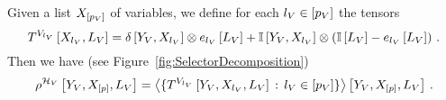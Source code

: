 \begin{theorem}\label{the:varSelectorDecomposition}
	Given a list $X_{[p_{V}]}$ of variables, we define for each $l_{V}\in[p_{V}]$ the tensors
		\[ T^{V_{l_{V}}}\left[X_{l_{V}},L_{V}\right] 
		= \delta\left[Y_{V},X_{l_{V}}\right] \otimes e_{l_{V}}\left[L_{V}\right] 
		+ \mathbb{I}\left[Y_{V},X_{l_{V}}\right] \otimes \left(\mathbb{I}\left[L_{V}\right] - e_{l_{V}}\left[L_{V}\right] \right) \, . 
		\]
	Then we have (see Figure~\ref{fig:SelectorDecomposition})
		\[ \rho^{\mathcal{H}_{V}}\left[Y_{V},X_{[p]},L_{V}\right]
		= \left\langle 
			\{T^{V_{l_{V}}}\left[Y_{V},X_{l_{V}},L_{V}\right] \, : \, l_{V}\in[p_{V}]\}
		\right\rangle \left[ Y_{V},X_{[p]},L_{V} \right] \, .
		\]
\end{theorem}
